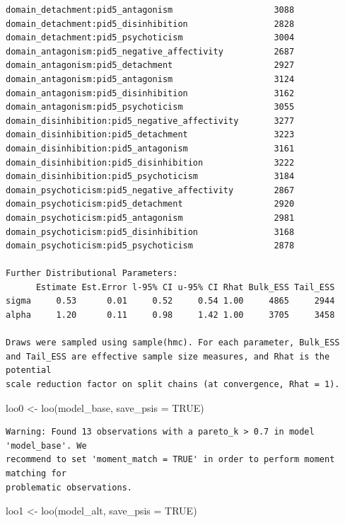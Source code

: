 \documentclass[
  11pt,
  a4paper,
  onecolumn]{article}
\newenvironment{Shaded}{}{}
\newcommand{\AttributeTok}[1]{\textcolor[rgb]{0.84,0.23,0.29}{#1}}
\newcommand{\ConstantTok}[1]{\textcolor[rgb]{0.00,0.36,0.77}{#1}}
\newcommand{\FunctionTok}[1]{\textcolor[rgb]{0.44,0.26,0.76}{#1}}
\newcommand{\NormalTok}[1]{\textcolor[rgb]{0.14,0.16,0.18}{#1}}
\newcommand{\OtherTok}[1]{\textcolor[rgb]{0.44,0.26,0.76}{#1}}
\begin{document}
\begin{verbatim}
domain_detachment:pid5_antagonism                    3088
domain_detachment:pid5_disinhibition                 2828
domain_detachment:pid5_psychoticism                  3004
domain_antagonism:pid5_negative_affectivity          2687
domain_antagonism:pid5_detachment                    2927
domain_antagonism:pid5_antagonism                    3124
domain_antagonism:pid5_disinhibition                 3162
domain_antagonism:pid5_psychoticism                  3055
domain_disinhibition:pid5_negative_affectivity       3277
domain_disinhibition:pid5_detachment                 3223
domain_disinhibition:pid5_antagonism                 3161
domain_disinhibition:pid5_disinhibition              3222
domain_disinhibition:pid5_psychoticism               3184
domain_psychoticism:pid5_negative_affectivity        2867
domain_psychoticism:pid5_detachment                  2920
domain_psychoticism:pid5_antagonism                  2981
domain_psychoticism:pid5_disinhibition               3168
domain_psychoticism:pid5_psychoticism                2878

Further Distributional Parameters:
      Estimate Est.Error l-95% CI u-95% CI Rhat Bulk_ESS Tail_ESS
sigma     0.53      0.01     0.52     0.54 1.00     4865     2944
alpha     1.20      0.11     0.98     1.42 1.00     3705     3458

Draws were sampled using sample(hmc). For each parameter, Bulk_ESS
and Tail_ESS are effective sample size measures, and Rhat is the potential
scale reduction factor on split chains (at convergence, Rhat = 1).
\end{verbatim}

\begin{Shaded}
\begin{Highlighting}[]
\NormalTok{loo0 }\OtherTok{\textless{}{-}} \FunctionTok{loo}\NormalTok{(model\_base, }\AttributeTok{save\_psis =} \ConstantTok{TRUE}\NormalTok{)}
\end{Highlighting}
\end{Shaded}

\begin{verbatim}
Warning: Found 13 observations with a pareto_k > 0.7 in model 'model_base'. We
recommend to set 'moment_match = TRUE' in order to perform moment matching for
problematic observations.
\end{verbatim}

\begin{Shaded}
\begin{Highlighting}[]
\NormalTok{loo1 }\OtherTok{\textless{}{-}} \FunctionTok{loo}\NormalTok{(model\_alt, }\AttributeTok{save\_psis =} \ConstantTok{TRUE}\NormalTok{)}
\end{Highlighting}
\end{Shaded}
\end{document}

